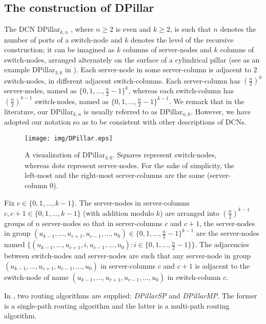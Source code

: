 \documentclass[]{amsart}
\begin{document}
\subsection{The construction of DPillar}\label{sec:DPillar}

The DCN DPillar$_{k,n}$ \cite{LiaoYinYin2012}, where $n\geq 2$ is even and $k\geq 2$, is such that $n$ denotes the
number of ports of a switch-node and $k$ denotes the level of
the recursive construction; it can be imagined as $k$ columns
of server-nodes and $k$ columns of switch-nodes, arranged alternately on the surface of a cylindrical pillar (see as an
example DPillar$_{3,6}$ in ). Each server-node in some server-column is adjacent to $2$ switch-nodes, in different adjacent switch-columns. Each server-column has $(\frac{n}{2})^k$ server-nodes, named as $\{0,1,\ldots,\frac{n}{2}-1\}^k$, whereas each switch-column has $(\frac{n}{2})^{k-1}$ switch-nodes, named as $\{0,1,\ldots,\frac{n}{2}-1\}^{k-1}$. We remark that in the literature, our DPillar$_{k,n}$ is usually referred to as DPillar$_{n,k}$. However, we have adopted our notation so as to be consistent with other descriptions of DCNs.

 \begin{figure}[ht]
 \centering
 \texttt{[image: img/DPillar.eps]}
 \caption{A visualization of DPillar$_{3,6}$. Squares represent switch-nodes, whereas dots represent server-nodes. For the sake of simplicity, the left-most and the right-most server-columns are the same (server-column 0).}
 \label{fig:DPillar}
 \end{figure}

Fix $c\in\{0,1,\ldots,k-1\}$.  The server-nodes in server-columns
$c,c+1\in\{0,1,\ldots,k-1\}$ (with addition modulo $k$) are arranged into $(\frac{n}{2})^{k-1}$ groups of $n$ server-nodes so that in server-columns $c$ and $c+1$, the server-nodes in group
$(u_{k-1},\ldots,u_{c+1},u_{c-1},\ldots,u_0)\in\{0,1,\ldots,\frac{n}{2}-1\}^{k-1}$ are the server-nodes named
$\{(u_{k-1},\ldots,u_{c+1},i,u_{c-1},\ldots,u_0):
i\in\{0,1,\ldots,\frac{n}{2}-1\}\}$.
The adjacencies between switch-nodes and server-nodes are such that any server-node in group $(u_{k-1},\ldots,u_{c+1},u_{c-1},\ldots,u_0)$ in server-columns $c$ and $c+1$ is adjacent to the switch-node of name $(u_{k-1},\ldots,u_{c+1},u_{c-1},\ldots,u_0)$ in switch-column $c$.

In \cite{LiaoYinYin2012}, two routing algorithms are supplied: \emph{DPillarSP\/} and \emph{DPillarMP\/}. The former is a single-path routing algorithm and the latter is a multi-path routing algorithm.
\end{document}
